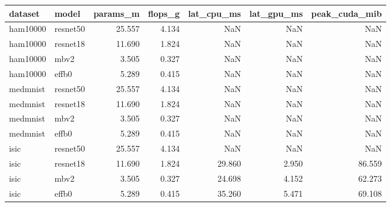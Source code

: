 \begin{tabular}{llrrrrr}
\toprule
dataset & model & params_m & flops_g & lat_cpu_ms & lat_gpu_ms & peak_cuda_mib \\
\midrule
ham10000 & resnet50 & 25.557 & 4.134 & NaN & NaN & NaN \\
ham10000 & resnet18 & 11.690 & 1.824 & NaN & NaN & NaN \\
ham10000 & mbv2 & 3.505 & 0.327 & NaN & NaN & NaN \\
ham10000 & effb0 & 5.289 & 0.415 & NaN & NaN & NaN \\
medmnist & resnet50 & 25.557 & 4.134 & NaN & NaN & NaN \\
medmnist & resnet18 & 11.690 & 1.824 & NaN & NaN & NaN \\
medmnist & mbv2 & 3.505 & 0.327 & NaN & NaN & NaN \\
medmnist & effb0 & 5.289 & 0.415 & NaN & NaN & NaN \\
isic & resnet50 & 25.557 & 4.134 & NaN & NaN & NaN \\
isic & resnet18 & 11.690 & 1.824 & 29.860 & 2.950 & 86.559 \\
isic & mbv2 & 3.505 & 0.327 & 24.698 & 4.152 & 62.273 \\
isic & effb0 & 5.289 & 0.415 & 35.260 & 5.471 & 69.108 \\
\bottomrule
\end{tabular}
